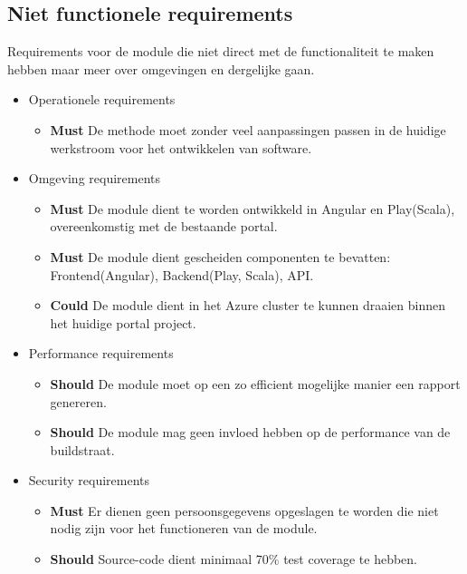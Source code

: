 \subsection{Niet functionele requirements}\label{subsec:niet-functionele-requirements}
Requirements voor de module die niet direct met de functionaliteit te maken hebben maar meer over omgevingen en dergelijke gaan.
\begin{itemize}
    \item Operationele requirements
    \begin{itemize}
        \item \textbf{Must} De methode moet zonder veel aanpassingen passen in de huidige werkstroom voor het ontwikkelen van software.
    \end{itemize}
    \item Omgeving requirements
    \begin{itemize}
        \item \textbf{Must} De module dient te worden ontwikkeld in Angular en Play(Scala), overeenkomstig met de bestaande portal.
        \item \textbf{Must} De module dient gescheiden componenten te bevatten: Frontend(Angular), Backend(Play, Scala), API\@.
        \item \textbf{Could} De module dient in het Azure cluster te kunnen draaien binnen het huidige portal project.
    \end{itemize}
    \item Performance requirements
    \begin{itemize}
        \item \textbf{Should} De module moet op een zo efficient mogelijke manier een rapport genereren.
        \item \textbf{Should} De module mag geen invloed hebben op de performance van de buildstraat.
    \end{itemize}
    \item Security requirements
    \begin{itemize}
        \item \textbf{Must} Er dienen geen persoonsgegevens opgeslagen te worden die niet nodig zijn voor het functioneren van de module.
        \item \textbf{Should} Source-code dient minimaal 70\% test coverage te hebben.
    \end{itemize}
\end{itemize}

